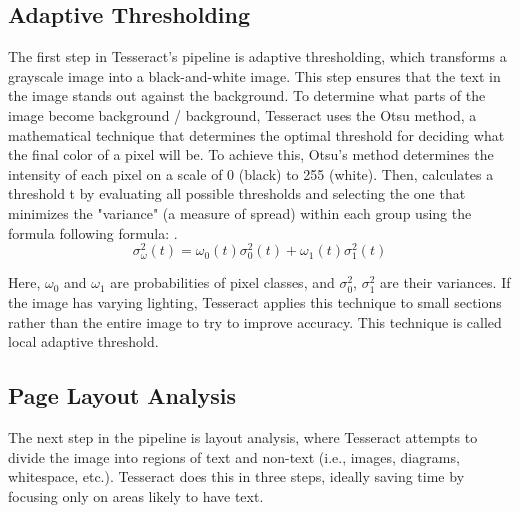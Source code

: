 \documentclass[10pt,twocolumn]{article}
\begin{document}
\subsection{Adaptive Thresholding}

The first step in Tesseract’s pipeline is adaptive thresholding, which transforms a grayscale image into a black-and-white image. This step ensures that the text in the image stands out against the background. To determine what parts of the image become background / background, Tesseract uses the Otsu method, a mathematical technique that determines the optimal threshold for deciding what the final color of a pixel will be. To achieve this, Otsu’s method determines the intensity of each pixel on a scale of 0 (black) to 255 (white). Then, calculates a threshold t by evaluating all possible thresholds and selecting the one that minimizes the "variance" (a measure of spread) within each group using the formula following formula: \cite{Overview_Akhil}.
\[
\sigma^2_{\omega}(t) = \omega_0(t)\sigma_0^2(t) + \omega_1(t)\sigma_1^2(t)
\]

Here, $\omega_0$ and $\omega_1$ are probabilities of pixel classes, and $\sigma_0^2$, $\sigma_1^2$ are their variances\cite{Overview_Akhil}.
If the image has varying lighting, Tesseract applies this technique to small sections rather than the entire image to try to improve accuracy. This technique is called local adaptive threshold.




\subsection{Page Layout Analysis}

The next step in the pipeline is layout analysis, where Tesseract attempts to divide the image into regions of text and non-text (i.e., images, diagrams, whitespace, etc.). Tesseract does this in three steps, ideally saving time by focusing only on areas likely to have text.
\end{document}
